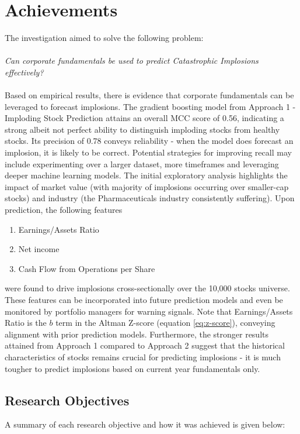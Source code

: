 \documentclass[a4paper]{report}
\begin{document}
\section{Achievements}
The investigation aimed to solve the following problem:\\\\\textit{Can corporate fundamentals be used to predict Catastrophic Implosions effectively?}\\\\Based on empirical results, there 
is evidence that corporate fundamentals can be leveraged to forecast implosions. The gradient boosting model from Approach 1 - Imploding Stock Prediction attains an overall 
MCC score of 0.56, indicating a strong albeit not perfect ability to distinguish imploding stocks from healthy stocks. Its precision of 0.78 conveys 
reliability - when the model does forecast an implosion, it is likely to be correct. Potential strategies for improving recall may include experimenting over 
a larger dataset, more timeframes and leveraging deeper machine learning models. The initial exploratory analysis highlights the impact of market value (with majority 
of implosions occurring over smaller-cap stocks) and industry (the Pharmaceuticals industry consistently suffering). Upon prediction, the following features
\begin{enumerate}
  \item Earnings/Assets Ratio
  \item Net income
  \item Cash Flow from Operations per Share
\end{enumerate}
were found to drive implosions cross-sectionally over the 10,000 stocks universe. These features can be incorporated into future prediction models and even be monitored by portfolio managers for warning signals. Note that Earnings/Assets 
Ratio is the \(b\) term in the Altman Z-score (equation \ref{eq:z-score}), conveying alignment with prior prediction models.
Furthermore, the stronger results attained from Approach 1 
compared to Approach 2 suggest that the historical characteristics of stocks remains crucial for predicting implosions - it is much tougher to predict implosions based 
on current year fundamentals only. 

\subsection{Research Objectives}
A summary of each research objective and how it was achieved is given below:
\end{document}
